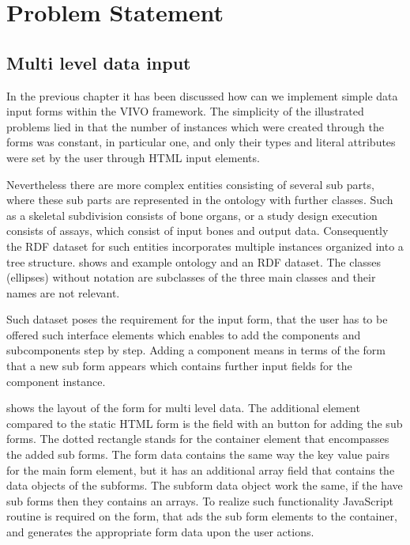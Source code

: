 \chapter{Problem Statement}


\section{Multi level data input}

In the previous chapter it has been discussed how can we implement simple data input forms within the VIVO framework. The simplicity of the illustrated problems lied in that the number of instances which were created through the forms was constant, in particular one, and only their types and literal attributes were set by the user through HTML input elements. 


Nevertheless there are more complex entities consisting of several sub parts, where these sub parts are represented in the ontology with further classes. Such as a skeletal subdivision consists of bone organs, or a study design execution consists of assays, which consist of input bones and output data. Consequently the RDF dataset for such entities incorporates multiple instances organized into a tree structure.  shows and example ontology and an RDF dataset. The classes (ellipses) without notation are subclasses of the three main classes and their names are not relevant.

Such dataset poses the requirement for the input form, that the user has to be offered such interface elements which enables to add the components and subcomponents step by step. Adding a component means in terms of the form that a new sub form appears which contains further input fields for the component instance.


 shows the layout of the form for multi level data. The additional element compared to the static HTML form is the field with an button for adding the sub forms. The dotted rectangle stands for the container element that encompasses the added sub forms. The form data contains the same way the key value pairs for the main form element, but it has an additional array field that contains the data objects of the subforms. The subform data object work the same, if the have sub forms then they contains an arrays. To realize such functionality JavaScript routine is required on the form, that ads the sub form elements to the container, and generates the appropriate form data upon the user actions.

